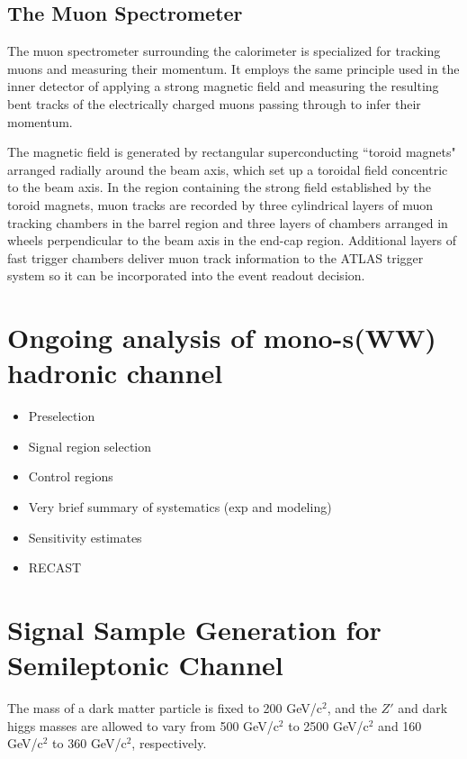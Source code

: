 \documentclass[12pt]{article}
\begin{document}
\subsection{The Muon Spectrometer}

The muon spectrometer \cite{atlas} surrounding the calorimeter is specialized for tracking muons and measuring their momentum. It employs the same principle used in the inner detector of applying a strong magnetic field and measuring the resulting bent tracks of the electrically charged muons passing through to infer their momentum. 

The magnetic field is generated by rectangular superconducting ``toroid magnets" arranged radially around the beam axis, which set up a toroidal field concentric to the beam axis. In the region containing the strong field established by the toroid magnets, muon tracks are recorded by three cylindrical layers of muon tracking chambers in the barrel region and three layers of chambers arranged in wheels perpendicular to the beam axis in the end-cap region. Additional layers of fast trigger chambers deliver muon track information to the ATLAS trigger system so it can be incorporated into the event readout decision. 

\newpage

\section{Ongoing analysis of mono-s(WW) hadronic channel}
\begin{itemize}
\item Preselection
\item Signal region selection
\item Control regions
\item Very brief summary of systematics (exp and modeling)
\item Sensitivity estimates
\item RECAST
\end{itemize}

\section{Signal Sample Generation for Semileptonic Channel}

The mass of a dark matter particle is fixed to 200 GeV/c$^2$, and the $Z'$ and dark higgs masses are allowed to vary from 500 GeV/c$^2$ to 2500 GeV/c$^2$ and 160 GeV/c$^2$ to 360 GeV/c$^2$, respectively. 
\end{document}
